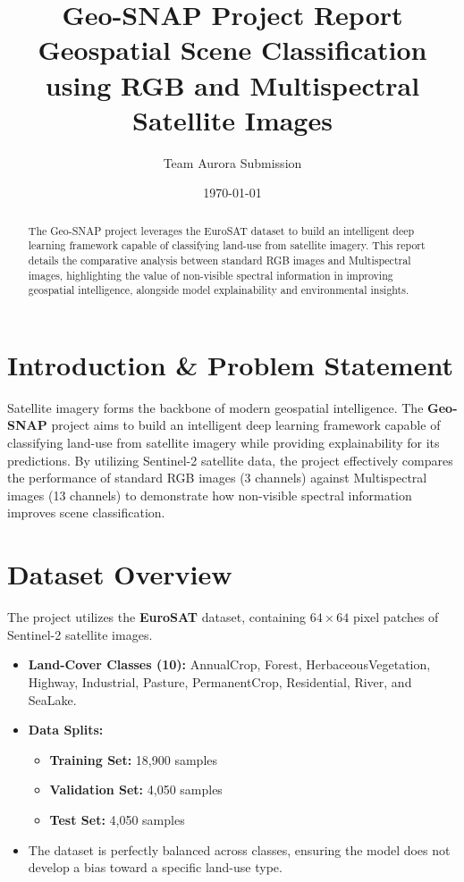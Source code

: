 \documentclass[11pt,a4paper]{article}
\title{\textbf{Geo-SNAP Project Report} \\ \large Geospatial Scene Classification using RGB and Multispectral Satellite Images}
\author{Team Aurora Submission}
\date{\today}
\begin{document}
\maketitle

\begin{abstract}
The Geo-SNAP project leverages the EuroSAT dataset to build an intelligent deep learning framework capable of classifying land-use from satellite imagery. This report details the comparative analysis between standard RGB images and Multispectral images, highlighting the value of non-visible spectral information in improving geospatial intelligence, alongside model explainability and environmental insights.
\end{abstract}

\section{Introduction \& Problem Statement}
Satellite imagery forms the backbone of modern geospatial intelligence. The \textbf{Geo-SNAP} project aims to build an intelligent deep learning framework capable of classifying land-use from satellite imagery while providing explainability for its predictions. By utilizing Sentinel-2 satellite data, the project effectively compares the performance of standard RGB images (3 channels) against Multispectral images (13 channels) to demonstrate how non-visible spectral information improves scene classification.

\section{Dataset Overview}
The project utilizes the \textbf{EuroSAT} dataset, containing $64 \times 64$ pixel patches of Sentinel-2 satellite images.

\begin{itemize}
    \item \textbf{Land-Cover Classes (10):} AnnualCrop, Forest, HerbaceousVegetation, Highway, Industrial, Pasture, PermanentCrop, Residential, River, and SeaLake.
    \item \textbf{Data Splits:}
    \begin{itemize}
        \item \textbf{Training Set:} 18,900 samples
        \item \textbf{Validation Set:} 4,050 samples
        \item \textbf{Test Set:} 4,050 samples
    \end{itemize}
    \item The dataset is perfectly balanced across classes, ensuring the model does not develop a bias toward a specific land-use type.
\end{itemize}
\end{document}
